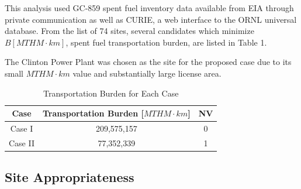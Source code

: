 This analysis used GC-859 spent fuel inventory data available from \gls{EIA} 
through private communication \cite{domenico_GC-859_2016} as well as \gls{CURIE}, a web interface to 
the \gls{ORNL} universal database\cite{ornl_centralized_2016}.
From the list of 74 sites, several candidates which minimize $B [MTHM\cdot 
km]$, spent fuel transportation burden, are listed in Table 1.
    
    \begin{table}[h]
    	\centering
    	
    	\caption {Reactors with relatively small spent fuel transportation burden $ [MTHM\cdot km]$.}
    		\end {table}

The Clinton Power Plant was chosen as the site for the proposed case due to its
small $MTHM\cdot km$ value and substantially large license 
area\cite{nrc_chapter_2007}.



\begin{table}[h]
	\centering
        \caption {Transportation Burden for Each Case}
		\begin{tabular}{|c|c|c|}
			\hline
			Case & Transportation Burden [$MTHM\cdot km$] & NV\\
			\hline
			Case I & 209,575,157  & 0\\
			Case II & 77,352,339 & 1 \\
                        \hline
                \end{tabular}
\end{table}
  

 \subsection{Site Appropriateness} 

